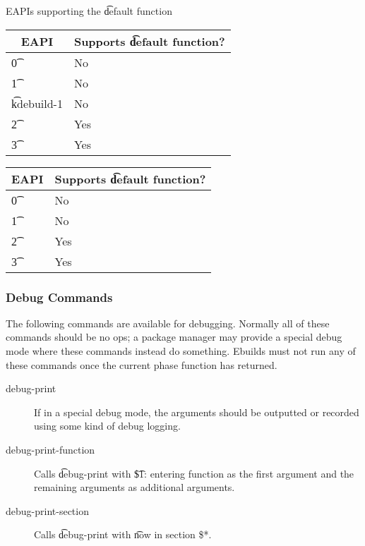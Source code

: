 \begin{centertable}{EAPIs supporting the \t{default} function} \label{tab:default-function-table}
\IFKDEBUILDELSE
{
    \begin{tabular}{ l l }
        \toprule
            \multicolumn{1}{c}{\textbf{EAPI}} &
            \multicolumn{1}{c}{\textbf{Supports \t{default} function?}} \\
            \midrule
    \t{0} & No \\
    \t{1} & No \\
    \t{kdebuild-1} & No \\
    \t{2} & Yes \\
    \t{3} & Yes \\
    \bottomrule
    \end{tabular}
}{
    \begin{tabular}{ l l }
        \toprule
            \multicolumn{1}{c}{\textbf{EAPI}} &
            \multicolumn{1}{c}{\textbf{Supports \t{default} function?}} \\
            \midrule
    \t{0} & No \\
    \t{1} & No \\
    \t{2} & Yes \\
    \t{3} & Yes \\
    \bottomrule
    \end{tabular}
}
\end{centertable}

\subsubsection{Debug Commands}
The following commands are available for debugging. Normally all of these commands should be no ops;
a package manager may provide a special debug mode where these commands instead do something.
Ebuilds must not run any of these commands once the current phase function has returned.

\begin{description}
\item[debug-print] If in a special debug mode, the arguments should be outputted or recorded using
    some kind of debug logging.
\item[debug-print-function] Calls \t{debug-print} with \t{\$1: entering function} as the first
    argument and the remaining arguments as additional arguments.
\item[debug-print-section] Calls \t{debug-print} with \t{now in section \$*}.
\end{description}

